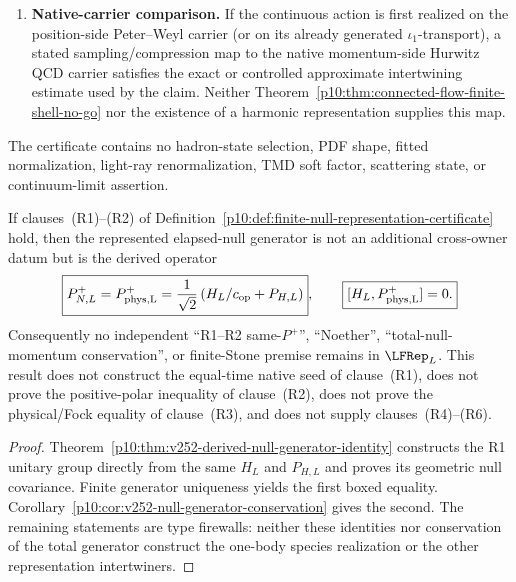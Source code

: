 \documentclass[12pt,a4paper]{article}
\begin{document}
\begin{definition}
\begin{enumerate}[label=\textnormal{(R\arabic*)},leftmargin=2.8em]
\item \textbf{Native-carrier comparison.}
If the continuous action is first realized on the position-side Peter--Weyl
carrier (or on its already generated \(\iota_1\)-transport), a stated
sampling/compression map to the native momentum-side Hurwitz QCD carrier
satisfies the exact or controlled approximate intertwining estimate used by
the claim.  Neither
Theorem~\ref{p10:thm:connected-flow-finite-shell-no-go} nor the existence of a
harmonic representation supplies this map.
\end{enumerate}
The certificate contains no hadron-state selection, PDF shape, fitted
normalization, light-ray renormalization, TMD soft factor, scattering state,
or continuum-limit assertion.
\end{definition}

\begin{theorem}
\label{p10:thm:v133-internal-total-null-conservation}
If clauses~\textnormal{(R1)--(R2)} of
Definition~\ref{p10:def:finite-null-representation-certificate} hold, then the
represented elapsed-null generator is not an additional cross-owner datum but
is the derived operator
\[
 \boxed{P_{N,L}^+=P_{\rm phys,L}^+
 =\frac1{\sqrt2}\left(H_L/c_{\rm op}+P_{H,L}\right)},
 \qquad
 \boxed{[H_L,P_{\rm phys,L}^+]=0.}
\]
Consequently no independent ``R1--R2 same-\(P^+\)'', ``Noether'',
``total-null-momentum conservation'', or finite-Stone premise remains in
\(\LFRep_L\).  This result does not construct the equal-time native seed of
clause~\textnormal{(R1)}, does not prove the positive-polar inequality of
clause~\textnormal{(R2)}, does not prove the physical/Fock equality of
clause~\textnormal{(R3)}, and does not supply clauses~\textnormal{(R4)--(R6)}.
\end{theorem}
\begin{proof}
Theorem~\ref{p10:thm:v252-derived-null-generator-identity} constructs the R1
unitary group directly from the same \(H_L\) and \(P_{H,L}\) and proves its
geometric null covariance.  Finite generator uniqueness yields the first
boxed equality.  Corollary~\ref{p10:cor:v252-null-generator-conservation}
gives the second.  The remaining statements are type firewalls: neither
these identities nor conservation of the total generator construct the
one-body species realization or the other representation intertwiners.
\end{proof}
\end{document}
